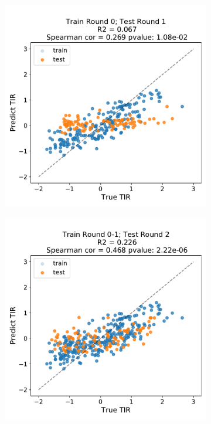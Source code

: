 \documentclass{article}
\begin{document}
    
\begin{figure}[!ht]
    \centering
    \begin{subfigure}[b]{0.49\textwidth}
        \centering
        \caption{}
        \includegraphics[scale=0.4]{plots/Main_Paper/scatter_abc1_FF_0.pdf}
    \end{subfigure}
    \begin{subfigure}[b]{0.49\textwidth}
        \centering
        \caption{}
        \includegraphics[scale=0.4]{plots/Main_Paper/scatter_abc1_FF_1.pdf}

\end{subfigure}
\end{figure}
\end{document}
